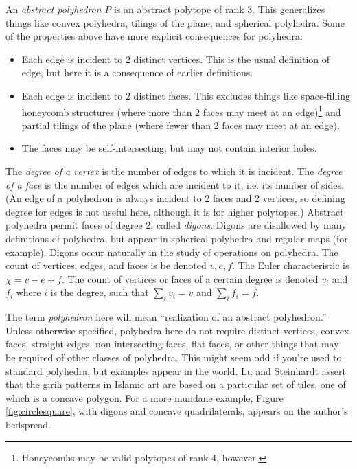 \documentclass{amsart}[12pt]
\begin{document}
An \textit{abstract polyhedron} $P$ is an abstract polytope of rank 3. This
generalizes things like convex polyhedra, tilings of the plane,
and spherical polyhedra. Some of the properties above have more
explicit consequences for polyhedra: \cite{grunbaum03}
\begin{itemize}
  \item Each edge is incident to 2 distinct vertices. This is the usual
  definition of edge, but here it is a consequence of earlier definitions.
  \item Each edge is incident to 2 distinct faces. This excludes things like
  space-filling honeycomb structures (where more than 2 faces may meet at an
  edge)\footnote{Honeycombs may be valid polytopes of rank 4, however.} and
  partial tilings of the plane (where fewer than 2 faces may meet at an edge).
  \item The faces may be self-intersecting, but may not contain interior holes.
\end{itemize}
The \textit{degree of a vertex} is the number of edges to which it is incident.
The \textit{degree of a face} is the number of edges which are incident to it,
i.e. its number of sides. (An edge of a polyhedron is always incident to 2
faces and 2 vertices, so defining degree for edges is not useful here, although
it is for higher polytopes.)
Abstract polyhedra permit faces of degree 2, called \textit{digons}. Digons are
disallowed by many definitions of polyhedra, but appear in spherical polyhedra
and regular maps (for example). Digons occur naturally in the study of
operations on polyhedra. The count of vertices, edges, and faces is be denoted
$v, e, f$. The Euler characteristic is $\chi = v - e + f$. The count of
vertices or faces of a certain degree is denoted $v_i$ and $f_i$ where $i$ is
the degree, such that $\sum_i v_i = v$ and $\sum_i f_i = f$.

The term \textit{polyhedron} here will mean ``realization of an abstract
polyhedron.'' Unless otherwise specified, polyhedra here do not require
distinct vertices, convex faces, straight edges, non-intersecting faces, flat
faces, or other things that may be required of other classes of polyhedra. This
might seem odd if you're used to standard polyhedra, but examples appear in the
world. Lu and Steinhardt \cite{lu07} assert that the girih patterns in Islamic
art are based on a particular set of tiles, one of which is a concave polygon.
For a more mundane example, Figure \ref{fig:circlesquare}, with digons and
concave quadrilaterals, appears on the author's bedspread.
\end{document}
